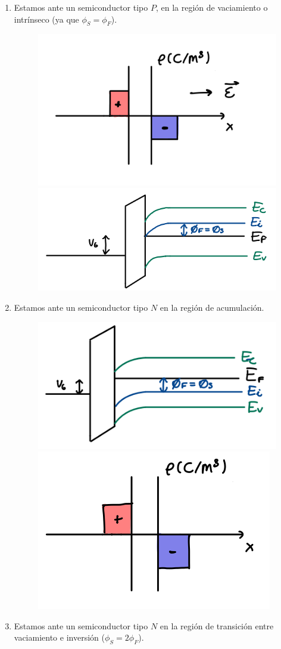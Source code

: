 \begin{enumerate}[label=\alph*)]
	\item Estamos ante un semiconductor tipo $P$, en la región de vaciamiento o intrínseco (ya que $\phi_S =  \phi_F$).
	      \begin{figure}[H]\centering
		      \includegraphics[width=0.45\linewidth]{Ejercicios/Ch_05/Ej_01_a1.png} \hfill
		      \includegraphics[width=0.45\linewidth]{Ejercicios/Ch_05/Ej_01_a2.png}
	      \end{figure}
	\item Estamos ante un semiconductor tipo $N$ en la región de acumulación.
	      \begin{figure}[H]\centering
		      \includegraphics[width=0.45\linewidth]{Ejercicios/Ch_05/Ej_01_b1.png} \hfill
		      \includegraphics[width=0.45\linewidth]{Ejercicios/Ch_05/Ej_01_b2.png}
	      \end{figure}
	\item Estamos ante un semiconductor tipo $N$ en la región de transición entre vaciamiento e inversión ($\phi_S=2\phi_F$).


\end{enumerate}
